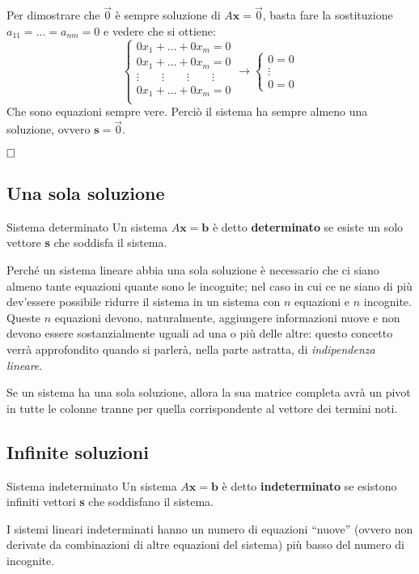 \begin{newdim}
    Per dimostrare che $\vec 0$ è sempre soluzione di $A\textbf{x} = \vec 0$, basta fare la sostituzione $a_{11} = \dots = a_{nm} = 0$ e vedere che si ottiene:
    \[
        \begin{cases}
            0x_{1} + \dots + 0x_{m} = 0 \\
            0x_{1} + \dots + 0x_{m} = 0 \\
            \vdots \quad\quad \vdots \quad\quad \vdots \quad\quad \vdots \\
            0x_{1} + \dots + 0x_{m} = 0 \\  
        \end{cases}
        \rightarrow
        \begin{cases}
            0 = 0 \\
            \vdots \\
            0 = 0
        \end{cases}
    \]
    Che sono equazioni sempre vere. Perciò il sistema ha sempre almeno una soluzione, ovvero $\textbf{s} = \vec 0$.

    $\qedwhite$
\end{newdim}
\subsection{Una sola soluzione}
\begin{newdef}{Sistema determinato}
    Un sistema $A\textbf{x} = \textbf{b}$ è detto \textbf{determinato} se esiste un solo vettore \textbf{s} che soddisfa il sistema.
\end{newdef}
Perché un sistema lineare abbia una sola soluzione è necessario che ci siano almeno tante equazioni quante sono le incognite; nel caso in cui ce ne siano di più dev'essere possibile ridurre il sistema in un sistema con $n$ equazioni e $n$ incognite. Queste $n$ equazioni devono, naturalmente, aggiungere informazioni nuove e non devono essere sostanzialmente uguali ad una o più delle altre: questo concetto verrà approfondito quando si parlerà, nella parte astratta, di \textit{indipendenza lineare}.

\begin{nb}
    Se un sistema ha una sola soluzione, allora la sua matrice completa avrà un pivot in tutte le colonne tranne per quella corrispondente al vettore dei termini noti.
\end{nb}

\subsection{Infinite soluzioni}
\begin{newdef}{Sistema indeterminato}
    Un sistema $A\textbf{x} = \textbf{b}$ è detto \textbf{indeterminato} se esistono infiniti vettori \textbf{s} che soddisfano il sistema.
\end{newdef}
I sistemi lineari indeterminati hanno un numero di equazioni ``nuove'' (ovvero non derivate da combinazioni di altre equazioni del sistema) più basso del numero di incognite.

